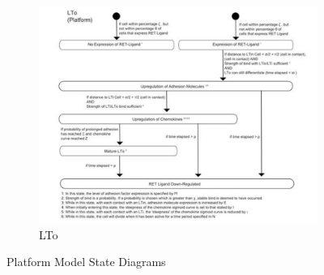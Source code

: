 \documentclass{UoYCSproject}
\begin{document}
\begin{figure}[htp]\ContinuedFloat
\centering
\begin{subfigure}{0.95\textwidth}
\centering
\includegraphics[width=\textwidth]{Appendix/Models/Platform/LTo}
\caption{LTo}
\end{subfigure}

\caption{Platform Model State Diagrams \cite{kieran_thesis, kieran_methodology}}
\label{fig:platform_state_diagrams}
\end{figure}
\end{document}

